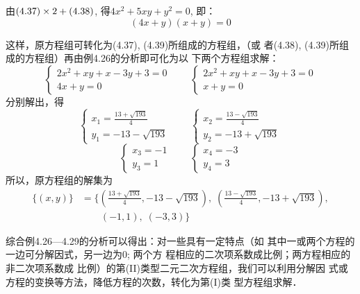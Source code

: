 \begin{solution}
    由$(4.37)\times2+(4.38)$, 得$4x^2+5xy+y^2=0$,  即：
\begin{equation}
    (4x+y)(x+y)=0
\end{equation}

这样，原方程组可转化为(4.37), (4.39)所组成的方程组，（或
者(4.38), (4.39)所组成的方程组）再由例4.26的分析即可化为以
下两个方程组求解：
\[\begin{cases}
    2x^2+xy+x-3y+3=0\\
4x+y=0
\end{cases}\qquad \begin{cases}
    2x^2+xy+x-3y+3=0\\
x+y=0
\end{cases}\]
分别解出，得
\[\begin{cases}
    x_1=\frac{13+\sqrt{193}}{4} \\ y_1=-13-\sqrt{193}
\end{cases}\qquad \begin{cases}
    x_2=\frac{13-\sqrt{193}}{4} \\ y_2=-13+\sqrt{193}
\end{cases}\]
\[\begin{cases}
    x_3=-1\\y_3=1
\end{cases}\qquad \begin{cases}
    x_4=-3\\ y_4=3
\end{cases}\]
所以，原方程组的解集为
\[\begin{split}
    \{(x,y)\}&=\Bigg\{\left(\frac{13+\sqrt{193}}{4}, -13-\sqrt{193}\right),\; \left(\frac{13-\sqrt{193}}{4}, -13+\sqrt{193}\right),\\
    &\qquad  (-1,1),\; (-3,3)\Bigg\}
\end{split}
\]

\end{solution}

综合例4.26---4.29的分析可以得出：对一些具有一定特点（如
其中一或两个方程的一边可分解因式，另一边为0; 两个方
程相应的二次项系数成比例；两方程相应的非二次项系数成
比例）的第(II)类型二元二次方程组，我们可以利用分解因
式或方程的变换等方法，降低方程的次数，转化为第(I)类
型方程组求解．

